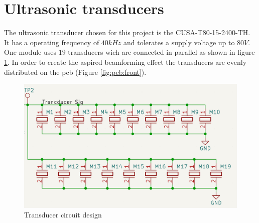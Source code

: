 \section{Ultrasonic transducers}

The ultrasonic transducer chosen for this project is the CUSA-T80-15-2400-TH. It has a operating frequency of $40kHz$ and tolerates a supply voltage up to $80V$.\cite{cui_devices_cusa-t80-15-2400-th_2020}\p
One module uses $19$ transducers wich are connected in parallel as shown in figure \ref{fig:pcb:transducer_circuit}. In order to create the aspired beamforming effect the transducers are evenly distributed on the pcb (Figure \ref{fig:pcb:front}).
%
\begin{figure}
  \centering
  \includegraphics[height=\mediumheight]{src/assets/pictures/circuit/transducer_circuit.png}
  \caption{Transducer circuit design}\label{fig:pcb:transducer_circuit}
\end{figure}